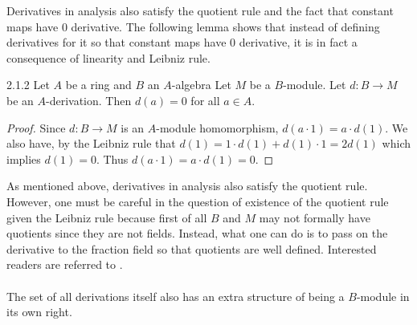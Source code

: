 \documentclass[a4paper]{article}
\begin{document}
Derivatives in analysis also satisfy the quotient rule and the fact that constant maps have $0$ derivative. The following lemma shows that instead of defining derivatives for it so that constant maps have $0$ derivative, it is in fact a consequence of linearity and Leibniz rule. 

\begin{lmm}{}{2.1.2} Let $A$ be a ring and $B$ an $A$-algebra Let $M$ be a $B$-module. Let $d:B\to M$ be an $A$-derivation. Then $d(a)=0$ for all $a\in A$. \tcbline
\begin{proof}
Since $d:B\to M$ is an $A$-module homomorphism, $d(a\cdot 1)=a\cdot d(1)$. We also have, by the Leibniz rule that $d(1)=1\cdot d(1)+d(1)\cdot 1=2d(1)$ which implies $d(1)=0$. Thus $d(a\cdot 1)=a\cdot d(1)=0$. 
\end{proof}
\end{lmm}

As mentioned above, derivatives in analysis also satisfy the quotient rule. However, one must be careful in the question of existence of the quotient rule given the Leibniz rule because first of all $B$ and $M$ may not formally have quotients since they are not fields. Instead, what one can do is to pass on the derivative to the fraction field so that quotients are well defined. Interested readers are referred to \cite{Zar-Sam}. \\~\\

The set of all derivations itself also has an extra structure of being a $B$-module in its own right. 
\end{document}
